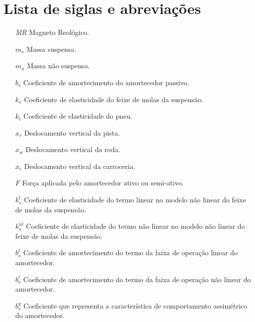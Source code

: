 \documentclass[a4paper]{ifacconf}
\begin{document}
    \section{Lista de siglas e abreviações}
    \begin{itemize} 
        \item [\emph{MR}] Magneto Reológico.
        \item [$m_s$] Massa suspensa.
        \item [$m_u$] Massa não suspensa.
        \item [$b_s$] Coeficiente de amortecimento do amortecedor passivo. 
        \item [$k_s$] Coeficiente de elasticidade do feixe de molas da suspensão.
        \item [$k_t$] Coeficiente de elasticidade do pneu.
        \item [$x_r$] Deslocamento vertical da pista.
        \item [$x_w$] Deslocamento vertical da roda.
        \item [$x_c$] Deslocamento vertical da carroceria.
        \item [$F$] Força aplicada pelo amortecedor ativo ou semi-ativo.
        \item [$k^{l}_{s}$] Coeficiente de elasticidade do termo linear no modelo não linear do feixe de molas da suspensão.
        \item [$k^{nl}_{s}$] Coeficiente de elasticidade do termo não linear no modelo não linear do feixe de molas da suspensão.
        \item [$b^{l}_{s}$] Coeficiente de amortecimento do termo da faixa de operação linear do amortecedor.
        \item [$b^{l}_{s}$] Coeficiente de amortecimento do termo da faixa de operação não linear do amortecedor.
        \item [$b^{y}_{s}$] Coeficiente que representa a característica  de comportamento assimétrico do amortecedor.
    \end{itemize}
    
\end{document}
